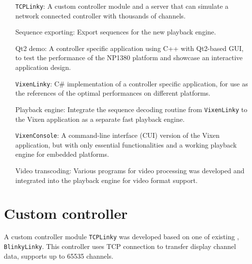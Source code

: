\renewcommand{\baselinestretch}{\mystretch}
\label{chap:Impl}

 

\begin{enumerate}[noitemsep,leftmargin=4cm]
  \item[\texttt{TCPLinky}:] A custom controller module and a server that can simulate a network connected controller with thousands of channels.
  \item[Sequence exporting:] Export sequences for the new playback engine.
  \item[Qt2 demo:] A controller specific application using C++ with Qt2-based GUI, to test the performance of the NP1380 platform and showcase an interactive application design.
  \item[\texttt{VixenLinky}:] C\# implementation of a controller specific application, for use as the references of the optimal performances on different platforms.
  \item[Playback engine:] Integrate the sequence decoding routine from \texttt{VixenLinky} to the Vixen application as a separate fast playback engine.
  \item[\texttt{VixenConsole}:] A command-line interface (CUI) version of the Vixen application, but with only essential functionalities and a working playback engine for embedded platforms.
  \item[Video transcoding:] Various programs for video processing was developed and integrated into the playback engine for video format support.
\end{enumerate}

\newpage

\section{Custom controller}
\label{sec:tcplinky}

A custom controller module  \texttt{TCPLinky} was developed based on one of  existing , \texttt{BlinkyLinky}. This controller uses TCP connection to transfer display channel data,  supports up to 65535 channels.

